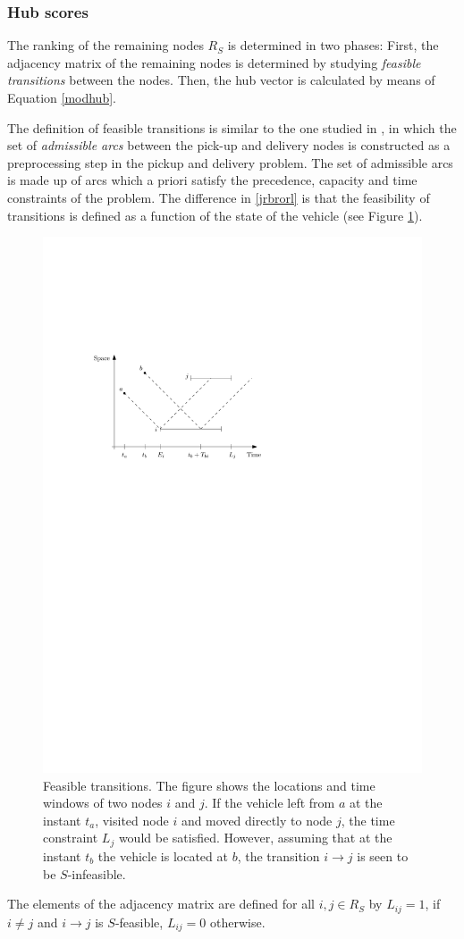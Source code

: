 \documentclass[dissertation,draft*]{aaltoseries}
\begin{document}
\subsubsection{Hub scores}
\label{feasibility}
The ranking of the remaining nodes $R_S$ is determined in two phases: 
First, the adjacency matrix of the remaining nodes is determined by studying 
\emph{feasible transitions} between the nodes.
Then, the hub vector is calculated by means of Equation \eqref{modhub}.

The definition of feasible transitions is similar to the one studied in \cite{dumas03}, 
in which the set of \emph{admissible arcs} between the pick-up and delivery nodes is constructed
as a preprocessing step in the pickup and delivery problem. The set of admissible arcs is 
made up of arcs which a priori satisfy the precedence, capacity and time constraints of the problem.
The difference in \ref{jrbrorl} is that the feasibility of 
transitions is defined as a function of the state of the vehicle (see Figure \ref{transitions01}).

\begin{figure}[ht]
\begin{center}
\includegraphics[width=0.5\columnwidth]{transitions01.pdf}
\caption{Feasible transitions. The figure shows the 
locations and time windows of two nodes $i$ and $j$.
If the vehicle left from $a$ at the instant $t_a$, visited node $i$
and moved directly to node $j$, the time constraint $L_j$ would be satisfied. 
However, assuming that at the instant $t_b$ the vehicle is located at $b$, the
transition $i \to j$ is seen to be $S$-infeasible.
}
\label{transitions01}
\end{center}
\end{figure}
The elements of the adjacency matrix are defined for all $i,j \in R_S$ by 
$L_{ij}= 1$, if $i \neq j$ and $i \to j$ is $S$-feasible, $L_{ij} = 0$ otherwise.
\end{document}
